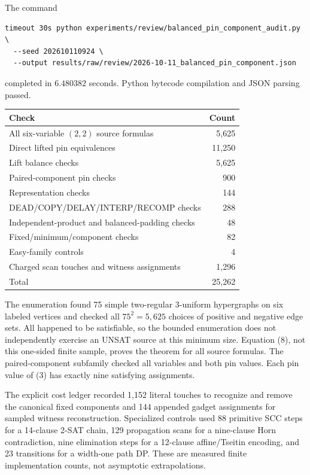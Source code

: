 \documentclass[11pt]{article}
\begin{document}
The command
\begin{verbatim}
timeout 30s python experiments/review/balanced_pin_component_audit.py \
  --seed 202610110924 \
  --output results/raw/review/2026-10-11_balanced_pin_component.json
\end{verbatim}
completed in $6.480382$ seconds.  Python bytecode compilation and JSON
parsing passed.

\begin{center}
\begin{tabular}{lr}
\toprule
Check & Count\\
\midrule
All six-variable $(2,2)$ source formulas & 5,625\\
Direct lifted pin equivalences & 11,250\\
Lift balance checks & 5,625\\
Paired-component pin checks & 900\\
Representation checks & 144\\
DEAD/COPY/DELAY/INTERP/RECOMP checks & 288\\
Independent-product and balanced-padding checks & 48\\
Fixed/minimum/component checks & 82\\
Easy-family controls & 4\\
Charged scan touches and witness assignments & 1,296\\
\midrule
Total & 25,262\\
\bottomrule
\end{tabular}
\end{center}

The enumeration found 75 simple two-regular 3-uniform hypergraphs on six
labeled vertices and checked all $75^2=5,625$ choices of positive and
negative edge sets.  All happened to be satisfiable, so the bounded
enumeration does not independently exercise an UNSAT source at this minimum
size.  Equation (8), not this one-sided finite sample, proves the theorem for
all source formulas.  The paired-component subfamily checked all variables
and both pin values.  Each pin value of (3) has exactly nine satisfying
assignments.

The explicit cost ledger recorded 1,152 literal touches to recognize and
remove the canonical fixed components and 144 appended gadget assignments
for sampled witness reconstruction.  Specialized controls used 88 primitive
SCC steps for a 14-clause 2-SAT chain, 129 propagation scans for a nine-clause
Horn contradiction, nine elimination steps for a 12-clause affine/Tseitin
encoding, and 23 transitions for a width-one path DP.  These are measured
finite implementation counts, not asymptotic extrapolations.
\end{document}
